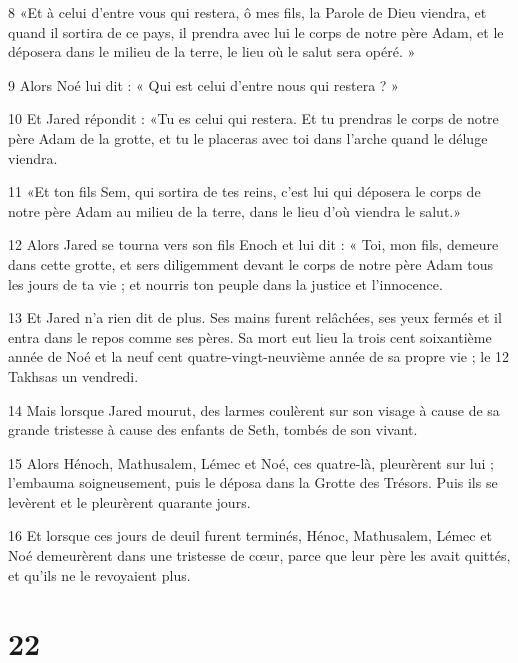 \par 8 «Et à celui d'entre vous qui restera, ô mes fils, la Parole de Dieu viendra, et quand il sortira de ce pays, il prendra avec lui le corps de notre père Adam, et le déposera dans le milieu de la terre, le lieu où le salut sera opéré. »

\par 9 Alors Noé lui dit : « Qui est celui d'entre nous qui restera ? »

\par 10 Et Jared répondit : «Tu es celui qui restera. Et tu prendras le corps de notre père Adam de la grotte, et tu le placeras avec toi dans l'arche quand le déluge viendra.

\par 11 «Et ton fils Sem, qui sortira de tes reins, c'est lui qui déposera le corps de notre père Adam au milieu de la terre, dans le lieu d'où viendra le salut.»

\par 12 Alors Jared se tourna vers son fils Enoch et lui dit : « Toi, mon fils, demeure dans cette grotte, et sers diligemment devant le corps de notre père Adam tous les jours de ta vie ; et nourris ton peuple dans la justice et l’innocence.

\par 13 Et Jared n'a rien dit de plus. Ses mains furent relâchées, ses yeux fermés et il entra dans le repos comme ses pères. Sa mort eut lieu la trois cent soixantième année de Noé et la neuf cent quatre-vingt-neuvième année de sa propre vie ; le 12 Takhsas un vendredi.

\par 14 Mais lorsque Jared mourut, des larmes coulèrent sur son visage à cause de sa grande tristesse à cause des enfants de Seth, tombés de son vivant.

\par 15 Alors Hénoch, Mathusalem, Lémec et Noé, ces quatre-là, pleurèrent sur lui ; l'embauma soigneusement, puis le déposa dans la Grotte des Trésors. Puis ils se levèrent et le pleurèrent quarante jours.

\par 16 Et lorsque ces jours de deuil furent terminés, Hénoc, Mathusalem, Lémec et Noé demeurèrent dans une tristesse de cœur, parce que leur père les avait quittés, et qu'ils ne le revoyaient plus.

\chapter{22}

